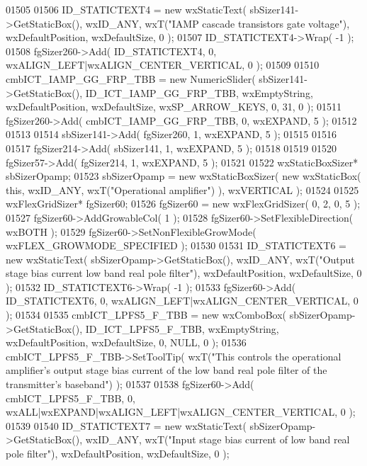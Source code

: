 \begin{DoxyCode}
01505     
01506     ID_STATICTEXT4 = \textcolor{keyword}{new} wxStaticText( sbSizer141->GetStaticBox(), wxID\_ANY, wxT(\textcolor{stringliteral}{"IAMP cascade transistors
       gate voltage"}), wxDefaultPosition, wxDefaultSize, 0 );
01507     ID_STATICTEXT4->Wrap( -1 );
01508     fgSizer260->Add( ID_STATICTEXT4, 0, wxALIGN\_LEFT|wxALIGN\_CENTER\_VERTICAL, 0 );
01509     
01510     cmbICT_IAMP_GG_FRP_TBB = \textcolor{keyword}{new} NumericSlider( sbSizer141->GetStaticBox(), 
      ID_ICT_IAMP_GG_FRP_TBB, wxEmptyString, wxDefaultPosition, wxDefaultSize, wxSP\_ARROW\_KEYS, 0, 31, 0 );
01511     fgSizer260->Add( cmbICT_IAMP_GG_FRP_TBB, 0, wxEXPAND, 5 );
01512     
01513     
01514     sbSizer141->Add( fgSizer260, 1, wxEXPAND, 5 );
01515     
01516     
01517     fgSizer214->Add( sbSizer141, 1, wxEXPAND, 5 );
01518     
01519     
01520     fgSizer57->Add( fgSizer214, 1, wxEXPAND, 5 );
01521     
01522     wxStaticBoxSizer* sbSizerOpamp;
01523     sbSizerOpamp = \textcolor{keyword}{new} wxStaticBoxSizer( \textcolor{keyword}{new} wxStaticBox( \textcolor{keyword}{this}, wxID\_ANY, wxT(\textcolor{stringliteral}{"Operational amplifier"}) ), 
      wxVERTICAL );
01524     
01525     wxFlexGridSizer* fgSizer60;
01526     fgSizer60 = \textcolor{keyword}{new} wxFlexGridSizer( 0, 2, 0, 5 );
01527     fgSizer60->AddGrowableCol( 1 );
01528     fgSizer60->SetFlexibleDirection( wxBOTH );
01529     fgSizer60->SetNonFlexibleGrowMode( wxFLEX\_GROWMODE\_SPECIFIED );
01530     
01531     ID_STATICTEXT6 = \textcolor{keyword}{new} wxStaticText( sbSizerOpamp->GetStaticBox(), wxID\_ANY, wxT(\textcolor{stringliteral}{"Output stage bias
       current low band real pole filter"}), wxDefaultPosition, wxDefaultSize, 0 );
01532     ID_STATICTEXT6->Wrap( -1 );
01533     fgSizer60->Add( ID_STATICTEXT6, 0, wxALIGN\_LEFT|wxALIGN\_CENTER\_VERTICAL, 0 );
01534     
01535     cmbICT_LPFS5_F_TBB = \textcolor{keyword}{new} wxComboBox( sbSizerOpamp->GetStaticBox(), 
      ID_ICT_LPFS5_F_TBB, wxEmptyString, wxDefaultPosition, wxDefaultSize, 0, NULL, 0 ); 
01536     cmbICT_LPFS5_F_TBB->SetToolTip( wxT(\textcolor{stringliteral}{"This controls the operational amplifier's output stage bias
       current of the low band real pole filter of the transmitter's baseband"}) );
01537     
01538     fgSizer60->Add( cmbICT_LPFS5_F_TBB, 0, wxALL|wxEXPAND|wxALIGN\_LEFT|wxALIGN\_CENTER\_VERTICAL, 0 );
01539     
01540     ID_STATICTEXT7 = \textcolor{keyword}{new} wxStaticText( sbSizerOpamp->GetStaticBox(), wxID\_ANY, wxT(\textcolor{stringliteral}{"Input stage bias
       current of low band real pole filter"}), wxDefaultPosition, wxDefaultSize, 0 );

\end{DoxyCode}
